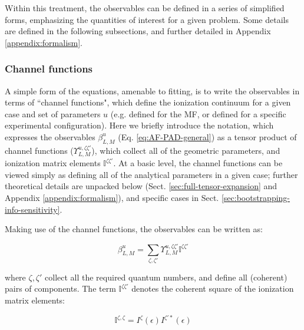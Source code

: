 \documentclass[10pt]{article}
\begin{document}
Within this treatment, the observables can be defined in a series of simplified forms, emphasizing the quantities of interest for a given problem. Some details are defined in the following subsections, and further detailed in Appendix \ref{appendix:formalism}.


\subsubsection{Channel functions\label{sec:channel-funcs}}

A simple form of the equations, amenable to fitting, is to write the observables in terms of ``channel functions", which define the ionization continuum for a given case and set of parameters $u$ (e.g. defined for the MF, or defined for a specific experimental configuration). Here we briefly introduce the notation, which expresses the observables $\beta_{L,M}^{u}$ (Eq. \ref{eq:AF-PAD-general}) as a tensor product of channel functions ($\varUpsilon_{L,M}^{u,\zeta\zeta'}$), which collect all of the geometric parameters, and ionization matrix elements $\mathbb{I}^{\zeta\zeta'}$. At a basic level, the channel functions can be viewed simply as defining all of the analytical parameters in a given case; further theoretical details are unpacked below (Sect. \ref{sec:full-tensor-expansion} and Appendix \ref{appendix:formalism}), and specific cases in Sect. \ref{sec:bootstrapping-info-sensitivity}.

Making use of the channel functions, the observables can be written as:

\begin{equation}
\beta_{L,M}^{u}=\sum_{\zeta,\zeta'}\varUpsilon_{L,M}^{u,\zeta\zeta'}\mathbb{I}^{\zeta\zeta'}\label{eqn:channel-fns}
\end{equation}


where $\zeta,\zeta'$ collect all the required quantum numbers, and define all (coherent) pairs of components. The term $\mathbb{I}^{\zeta\zeta'}$ denotes the coherent square of the ionization matrix elements:

\begin{equation}
\mathbb{I}^{\zeta,\zeta}=I^{\zeta}(\epsilon)I^{\zeta'*}(\epsilon)
\label{eqn:I-zeta}
\end{equation}
\end{document}
